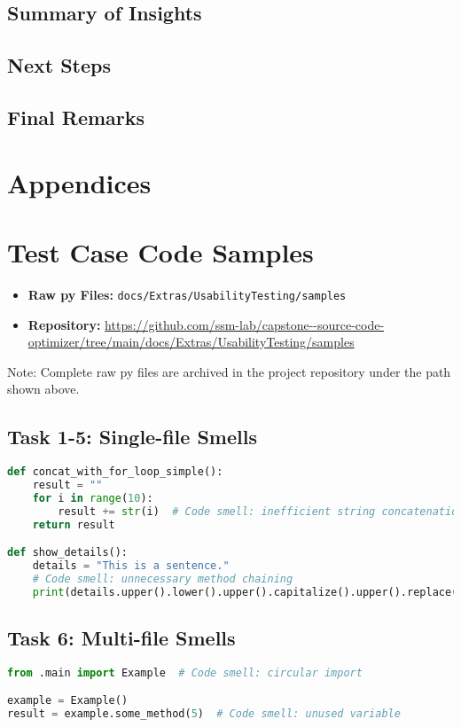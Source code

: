 \documentclass{article}
\begin{document}
\subsection{Summary of Insights}
\subsection{Next Steps}
\subsection{Final Remarks}

\newpage
\section*{Appendices}

\section{Test Case Code Samples}
\label{app:code}


\begin{itemize}
    \item \textbf{Raw py Files:} \texttt{docs/Extras/UsabilityTesting/samples}
    \item \textbf{Repository:} \url{https://github.com/ssm-lab/capstone--source-code-optimizer/tree/main/docs/Extras/UsabilityTesting/samples}
\end{itemize}

\noindent
\footnotesize{Note: Complete raw py files are archived in the project repository under the path shown above.}


\subsection{Task 1-5: Single-file Smells}
\begin{lstlisting}[language=Python,caption={String Manipulation Smells (sample.py)},label=lst:task15]
def concat_with_for_loop_simple():
    result = ""
    for i in range(10):
        result += str(i)  # Code smell: inefficient string concatenation
    return result

def show_details():
    details = "This is a sentence."
    # Code smell: unnecessary method chaining
    print(details.upper().lower().upper().capitalize().upper().replace("|", "-"))
\end{lstlisting}

\subsection{Task 6: Multi-file Smells}
\begin{lstlisting}[language=Python,caption={Extra1 File (extra1.py)},label=lst:task6a]
from .main import Example  # Code smell: circular import

example = Example()
result = example.some_method(5)  # Code smell: unused variable
\end{lstlisting}
\end{document}
